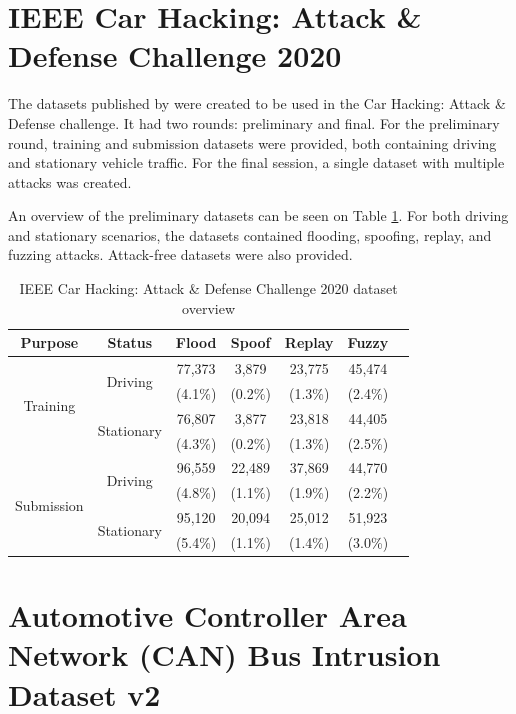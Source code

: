\section{IEEE Car Hacking: Attack \& Defense Challenge 2020}

The datasets published by \cite{kang2021car} were created to be used in the Car Hacking: Attack \& Defense challenge. It had two rounds: preliminary and final. For the preliminary round, training and submission datasets were provided, both containing driving and stationary vehicle traffic. For the final session, a single dataset with multiple attacks was created.\par
An overview of the preliminary datasets can be seen on Table \ref{tab:ieee_challenge_dataset_overview}. For both driving and stationary scenarios, the datasets contained flooding, spoofing, replay, and fuzzing attacks. Attack-free datasets were also provided.

\begin{table}
    \centering
    \begin{tabular}{*{7}{c}}
        \toprule
        \textbf{Purpose} & \textbf{Status} & \textbf{Flood} & \textbf{Spoof} & \textbf{Replay} & \textbf{Fuzzy}\\
        \midrule
        \multirow{4}{*}{Training} & \multirow{2}{*}{Driving} & 77,373 & 3,879 & 23,775 & 45,474\\
        & & (4.1\%) & (0.2\%) & (1.3\%) & (2.4\%)\\
        & \multirow{2}{*}{Stationary} & 76,807 & 3,877 & 23,818 & 44,405\\
        & & (4.3\%) & (0.2\%) & (1.3\%) & (2.5\%)\\
        \midrule
        \multirow{4}{*}{Submission} & \multirow{2}{*}{Driving} & 96,559 & 22,489 & 37,869 & 44,770\\
        & & (4.8\%) & (1.1\%) & (1.9\%) & (2.2\%)\\
        & \multirow{2}{*}{Stationary} & 95,120 & 20,094 & 25,012 & 51,923 \\
        & & (5.4\%) & (1.1\%) & (1.4\%) & (3.0\%)\\
        \bottomrule
    \end{tabular}
    \caption{IEEE Car Hacking: Attack \& Defense Challenge 2020 dataset overview}
    \label{tab:ieee_challenge_dataset_overview}
\end{table}

\section{Automotive Controller Area Network (CAN) Bus Intrusion Dataset v2}
\label{subsec:tue_dataset}

